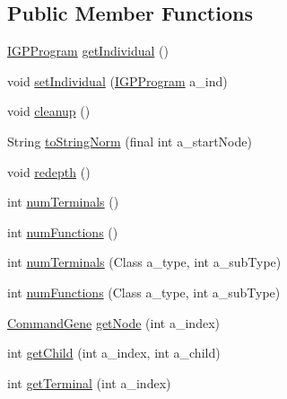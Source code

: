 \subsection*{Public Member Functions}
\begin{DoxyCompactItemize}
\item 
\hyperlink{interfaceorg_1_1jgap_1_1gp_1_1_i_g_p_program}{I\-G\-P\-Program} \hyperlink{interfaceorg_1_1jgap_1_1gp_1_1_i_g_p_chromosome_ad23867a04266a9b7f28936fe516925ad}{get\-Individual} ()
\item 
void \hyperlink{interfaceorg_1_1jgap_1_1gp_1_1_i_g_p_chromosome_a6e828748e1d0dfb0f1120a6aafa67fd0}{set\-Individual} (\hyperlink{interfaceorg_1_1jgap_1_1gp_1_1_i_g_p_program}{I\-G\-P\-Program} a\-\_\-ind)
\item 
void \hyperlink{interfaceorg_1_1jgap_1_1gp_1_1_i_g_p_chromosome_a4aab1f31cdecde983111b94e5ecc4193}{cleanup} ()
\item 
String \hyperlink{interfaceorg_1_1jgap_1_1gp_1_1_i_g_p_chromosome_a69a39548f0af1c9746bf6b2352f1a879}{to\-String\-Norm} (final int a\-\_\-start\-Node)
\item 
void \hyperlink{interfaceorg_1_1jgap_1_1gp_1_1_i_g_p_chromosome_a0f6a34e86c91d5271761093ad69ecc96}{redepth} ()
\item 
int \hyperlink{interfaceorg_1_1jgap_1_1gp_1_1_i_g_p_chromosome_af948067a13b619fb1e8493eedc8a7bba}{num\-Terminals} ()
\item 
int \hyperlink{interfaceorg_1_1jgap_1_1gp_1_1_i_g_p_chromosome_ac76c23a65ea2d42c259308ad56c09f09}{num\-Functions} ()
\item 
int \hyperlink{interfaceorg_1_1jgap_1_1gp_1_1_i_g_p_chromosome_a771b466e4e0d30e692dd611d8eedc1ab}{num\-Terminals} (Class a\-\_\-type, int a\-\_\-sub\-Type)
\item 
int \hyperlink{interfaceorg_1_1jgap_1_1gp_1_1_i_g_p_chromosome_a059849cd0d034570934a095fd7887c72}{num\-Functions} (Class a\-\_\-type, int a\-\_\-sub\-Type)
\item 
\hyperlink{classorg_1_1jgap_1_1gp_1_1_command_gene}{Command\-Gene} \hyperlink{interfaceorg_1_1jgap_1_1gp_1_1_i_g_p_chromosome_ac251ef923a060b3033553a832c8eaa58}{get\-Node} (int a\-\_\-index)
\item 
int \hyperlink{interfaceorg_1_1jgap_1_1gp_1_1_i_g_p_chromosome_a4e13390ee43bbe0a8a491fddcadae226}{get\-Child} (int a\-\_\-index, int a\-\_\-child)
\item 
int \hyperlink{interfaceorg_1_1jgap_1_1gp_1_1_i_g_p_chromosome_a816df9f1773505f2494867c955400524}{get\-Terminal} (int a\-\_\-index)

\end{DoxyCompactItemize}
